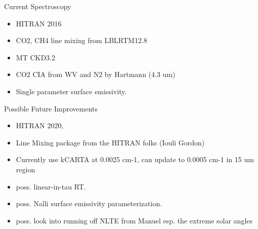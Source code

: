 \documentclass[10pt,t]{beamer}
\begin{document}
\begin{frame}{Current Spectroscopy}

  \begin{itemize}
  \item HITRAN 2016
  \item CO2, CH4 line mixing from LBLRTM12.8
  \item MT CKD3.2
  \item CO2 CIA from WV and N2 by Hartmann (4.3 um)
  \item Single parameter surface emissivity.
    

  \end{itemize}
\end{frame}
\begin{frame}{Possible Future Improvements}

  \begin{itemize}
  \item HITRAN 2020,
  \item Line Mixing package from the HITRAN folks (Iouli Gordon)
  \item Currently use kCARTA at 0.0025 cm-1, can update to 0.0005 cm-1 in 15 um region
  \item poss. linear-in-tau RT.
  \item poss. Nalli surface emissivity parameterization.
    \item poss. look into running off NLTE from Manuel esp. the extreme solar angles
      
  \end{itemize}
\end{frame}
\end{document}
